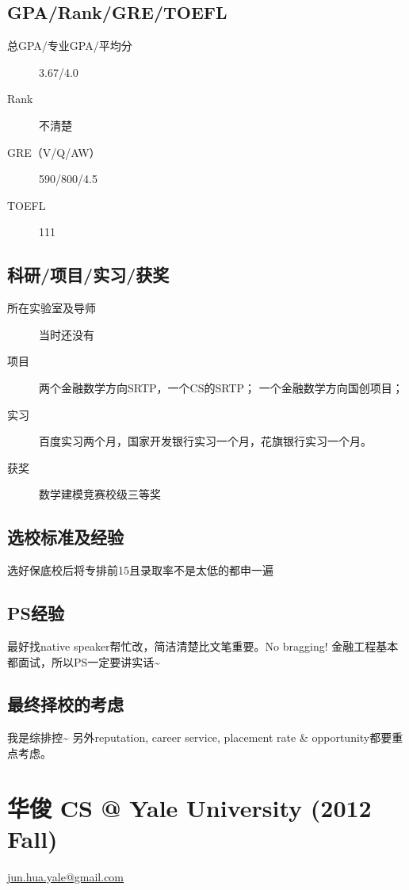 \documentclass[11pt,fleqn,openany]{book} %
\begin{document}
\subsection*{GPA/Rank/GRE/TOEFL}
\begin{description}
\item[总GPA/专业GPA/平均分] 3.67/4.0
\item[Rank] 不清楚
\item[GRE（V/Q/AW）] 590/800/4.5
\item[TOEFL] 111
\end{description}

\subsection*{科研/项目/实习/获奖}
\begin{description}
\item[所在实验室及导师] 当时还没有
\item[项目] 两个金融数学方向SRTP，一个CS的SRTP；
一个金融数学方向国创项目；
\item[实习] 百度实习两个月，国家开发银行实习一个月，花旗银行实习一个月。
\item[获奖] 数学建模竞赛校级三等奖
\end{description}
\subsection*{选校标准及经验}
选好保底校后将专排前15且录取率不是太低的都申一遍
\subsection*{PS经验}
最好找native speaker帮忙改，简洁清楚比文笔重要。No bragging! 金融工程基本都面试，所以PS一定要讲实话\textasciitilde{}
\subsection*{最终择校的考虑}
我是综排控\textasciitilde{}
另外reputation, career service, placement rate \& opportunity都要重点考虑。
\clearpage
\section{华俊 CS @ Yale University (2012 Fall)}
\hfill \href{mailto:jun.hua.yale@gmail.com}{jun.hua.yale@gmail.com}
\end{document}
